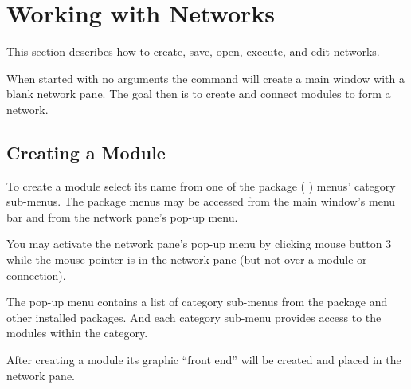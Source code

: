 %

  \newcommand{\modgraphic}%
  {\centerline{\epsfig{file=Figures/modgraphic-1.eps.gz,width=4in,
        bbllx=18, bblly=18, bburx=594, bbury=355}}}
\begin{htmlonly}
  \newcommand{\modgraphic}{%
  \htmladdimg[align=top,width="256",alt="SCIRun Module Graphic"]
  {../Figures/modgraphic-1.gif}}
\end{htmlonly}

  \newcommand{\moddialog}%
  {\centerline{\epsfig{file=Figures/moddialog.eps.gz,
        bbllx=0, bblly=0, bburx=201, bbury=282}}}
\begin{htmlonly}
  \newcommand{\moddialog}{%
  \htmladdimg[align=top,alt="SCIRun Module Dialog"]
  {../Figures/moddialog.jpg}}
\end{htmlonly}

\section{Working with Networks}
\label{sec:workwithnets}

This section describes how to create, save, open, execute, and edit
networks.

When started with no arguments the  command will create a
main window with a blank network pane.  The goal then is to create and
connect modules to form a network.


\subsection{Creating a Module}
\label{sec:creatingmodules}

To create a module select its name from one of the package (\eg{} \sr)
menus' category sub-menus.  The package menus may be accessed from the main
window's menu bar and from the network pane's pop-up menu.

You may activate the network pane's pop-up menu by clicking mouse button 3
while the mouse pointer is in the network pane (but not over a module or
connection).  

The pop-up menu contains a list of category sub-menus from the \sr{} package
and other installed packages.  And each category sub-menu provides
access to the modules within the category.

After creating a module its graphic ``front end'' will be created and
placed in the network pane.

